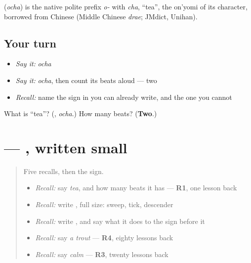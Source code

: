 \begin{cousinweb}
\textbf{} (\emph{ocha}) is the native polite prefix \emph{o-} with \emph{cha}, \textquotedblleft{}tea\textquotedblright{}, the on'yomi of its character, borrowed from Chinese (Middle Chinese \emph{drae}; JMdict, Unihan).
\end{cousinweb}

\subsection*{Your turn}
\begin{itemize}
\raggedright
  \item \emph{Say it:} \emph{ocha}
  \item \emph{Say it:} \emph{ocha}, then count its beats aloud — two
  \item \emph{Recall:} name the sign in \textbf{} you can already write, and the one you cannot
\end{itemize}

\begin{tcolorbox}[breakable,colback=teal!4,colframe=teal!35!black,title={Before you move on}]
What is \textquotedblleft{}tea\textquotedblright{}? (\textbf{}, \emph{ocha}.) How many beats? (\textbf{Two}.)
\end{tcolorbox}
\section[\texorpdfstring{\ja{ゃ} (small ya)}{ゃ (small ya)}]{ — , written small}

\label{lesson:JA-W131-small-ya}



\begin{quote}
Five recalls, then the sign.

\begin{itemize}
\raggedright
  \item \emph{Recall:} say \emph{tea}, and how many beats it has — \textbf{R1}, one lesson back
  \item \emph{Recall:} write \textbf{}, full size: sweep, tick, descender
  \item \emph{Recall:} write \textbf{}, and say what it does to the sign before it
  \item \emph{Recall:} say \emph{a trout} — \textbf{R4}, eighty lessons back
  \item \emph{Recall:} say \emph{calm} — \textbf{R3}, twenty lessons back
\end{itemize}
\end{quote}

